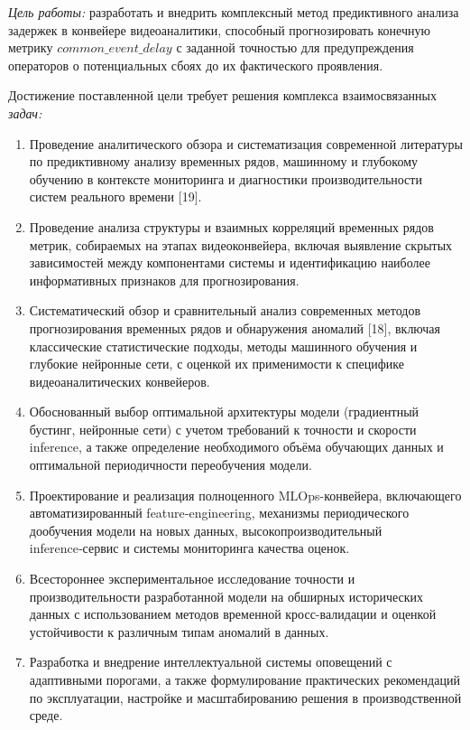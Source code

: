 \hspace*{1.25cm}\textit{Цель работы:} разработать и внедрить комплексный метод предиктивного анализа задержек в конвейере видеоаналитики, способный прогнозировать конечную метрику $common\_event\_delay$ с заданной точностью для предупреждения операторов о потенциальных сбоях до их фактического проявления.

\hspace*{1.25cm}Достижение поставленной цели требует решения комплекса взаимосвязанных \textit{задач:}

\begin{enumerate}
	\item Проведение аналитического обзора и систематизация современной литературы по предиктивному анализу временных рядов, машинному и глубокому обучению в контексте мониторинга и диагностики производительности систем реального времени [19].
	\item Проведение анализа структуры и взаимных корреляций временных рядов метрик, собираемых на этапах видеоконвейера, включая выявление скрытых зависимостей между компонентами системы и идентификацию наиболее информативных признаков для прогнозирования.
	\item Систематический обзор и сравнительный анализ современных методов прогнозирования временных рядов и обнаружения аномалий [18], включая классические статистические подходы, методы машинного обучения и глубокие нейронные сети, с оценкой их применимости к специфике видеоаналитических конвейеров.
	\item Обоснованный выбор оптимальной архитектуры модели (градиентный бустинг, нейронные сети) с учетом требований к точности и скорости inference, а также определение необходимого объёма обучающих данных и оптимальной периодичности переобучения модели.
	\item Проектирование и реализация полноценного MLOps-конвейера, включающего автоматизированный feature‑engineering, механизмы периодического дообучения модели на новых данных, высокопроизводительный inference‑сервис и системы мониторинга качества оценок.
	\item Всестороннее экспериментальное исследование точности и производительности разработанной модели на обширных исторических данных с использованием методов временной кросс-валидации и оценкой устойчивости к различным типам аномалий в данных.
	\item Разработка и внедрение интеллектуальной системы оповещений с адаптивными порогами, а также формулирование практических рекомендаций по эксплуатации, настройке и масштабированию решения в производственной среде.
\end{enumerate}

